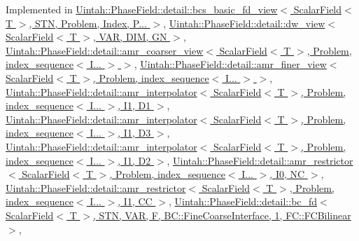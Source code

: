 Implemented in \hyperlink{classUintah_1_1PhaseField_1_1detail_1_1bcs__basic__fd__view_3_01ScalarField_3_01T_01_4_00_01STN_07caa9955adf783da0505eac75e76f08_afe8b66fd39607e8f5b5e79ae5d6e0df3}{Uintah\+::\+Phase\+Field\+::detail\+::bcs\+\_\+basic\+\_\+fd\+\_\+view$<$ Scalar\+Field$<$ T $>$, S\+T\+N, Problem, Index, P... $>$}, \hyperlink{classUintah_1_1PhaseField_1_1detail_1_1dw__view_3_01ScalarField_3_01T_01_4_00_01VAR_00_01DIM_00_01GN_01_4_ac2693bea259a1182f011d27198a69ac6}{Uintah\+::\+Phase\+Field\+::detail\+::dw\+\_\+view$<$ Scalar\+Field$<$ T $>$, V\+A\+R, D\+I\+M, G\+N $>$}, \hyperlink{classUintah_1_1PhaseField_1_1detail_1_1amr__coarser__view_3_01ScalarField_3_01T_01_4_00_01Proble9cadea116dab5bdb44bb3e29abbe99ef_abe4876f94a9c77e38b7c3d434f86b3c0}{Uintah\+::\+Phase\+Field\+::detail\+::amr\+\_\+coarser\+\_\+view$<$ Scalar\+Field$<$ T $>$, Problem, index\+\_\+sequence$<$ I... $>$ $>$}, \hyperlink{classUintah_1_1PhaseField_1_1detail_1_1amr__finer__view_3_01ScalarField_3_01T_01_4_00_01Problem_810ae3f886a4d3bdb2b37c629369a2ec_acc717dc37c60169bc4c85fbaaea766b3}{Uintah\+::\+Phase\+Field\+::detail\+::amr\+\_\+finer\+\_\+view$<$ Scalar\+Field$<$ T $>$, Problem, index\+\_\+sequence$<$ I... $>$ $>$}, \hyperlink{classUintah_1_1PhaseField_1_1detail_1_1amr__interpolator_3_01ScalarField_3_01T_01_4_00_01Problem71844444bc14a03c0566689b6b502040_aa8b73dcc7d87c412ecb5540689d33fe9}{Uintah\+::\+Phase\+Field\+::detail\+::amr\+\_\+interpolator$<$ Scalar\+Field$<$ T $>$, Problem, index\+\_\+sequence$<$ I... $>$, I1, D1 $>$}, \hyperlink{classUintah_1_1PhaseField_1_1detail_1_1amr__interpolator_3_01ScalarField_3_01T_01_4_00_01Problemdf68628a6010a1e1526666730125c372_a2bd6c99b7578b0f8842dff6deb19caca}{Uintah\+::\+Phase\+Field\+::detail\+::amr\+\_\+interpolator$<$ Scalar\+Field$<$ T $>$, Problem, index\+\_\+sequence$<$ I... $>$, I1, D3 $>$}, \hyperlink{classUintah_1_1PhaseField_1_1detail_1_1amr__interpolator_3_01ScalarField_3_01T_01_4_00_01Problemd2db9de1754b5450c93c191a9275f5ed_a2dfec8ca1eebdd59bda5dec83403d674}{Uintah\+::\+Phase\+Field\+::detail\+::amr\+\_\+interpolator$<$ Scalar\+Field$<$ T $>$, Problem, index\+\_\+sequence$<$ I... $>$, I1, D2 $>$}, \hyperlink{classUintah_1_1PhaseField_1_1detail_1_1amr__restrictor_3_01ScalarField_3_01T_01_4_00_01Problem_05760ee5d1d3adcc969b3f56f71e72acb_aa937cac548dc6bb5ebda0907804d5434}{Uintah\+::\+Phase\+Field\+::detail\+::amr\+\_\+restrictor$<$ Scalar\+Field$<$ T $>$, Problem, index\+\_\+sequence$<$ I... $>$, I0, N\+C $>$}, \hyperlink{classUintah_1_1PhaseField_1_1detail_1_1amr__restrictor_3_01ScalarField_3_01T_01_4_00_01Problem_0778720acc9a55f696b8537356a4dbcae_a9b2995c37fd05414ef795bab71d89693}{Uintah\+::\+Phase\+Field\+::detail\+::amr\+\_\+restrictor$<$ Scalar\+Field$<$ T $>$, Problem, index\+\_\+sequence$<$ I... $>$, I1, C\+C $>$}, \hyperlink{classUintah_1_1PhaseField_1_1detail_1_1bc__fd_3_01ScalarField_3_01T_01_4_00_01STN_00_01VAR_00_01bd5f5aa94f34afad5c8a785ee391ed2b_a43e765b95c9cbc27cc55ae316f3c9e57}{Uintah\+::\+Phase\+Field\+::detail\+::bc\+\_\+fd$<$ Scalar\+Field$<$ T $>$, S\+T\+N, V\+A\+R, F, B\+C\+::\+Fine\+Coarse\+Interface, 1, F\+C\+::\+F\+C\+Bilinear $>$}, 